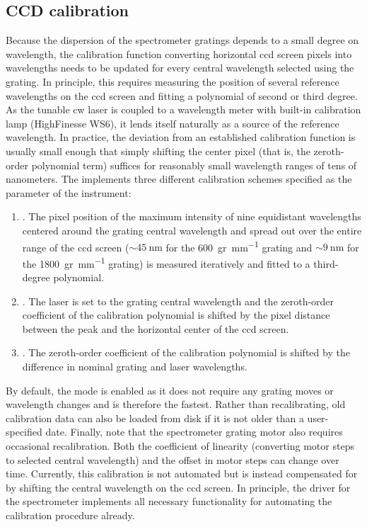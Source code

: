 \subsection{CCD calibration}\label{subsec:sec:exp:mjolnir:calibration:ccd}
Because the dispersion of the spectrometer gratings depends to a small degree on wavelength, the calibration function converting horizontal \gls{ccd} screen pixels into wavelengths needs to be updated for every central wavelength selected using the grating.
In principle, this requires measuring the position of several reference wavelengths on the \gls{ccd} screen and fitting a polynomial of second or third degree.
As the tunable \gls{cw} laser is coupled to a wavelength meter with built-in calibration lamp (HighFinesse WS6), it lends itself naturally as a source of the reference wavelength.
In practice, the deviation from an established calibration function is usually small enough that simply shifting the center pixel (that is, the zeroth-order polynomial term) suffices for reasonably small wavelength ranges of tens of nanometers.
The  implements three different calibration schemes specified as the  parameter of the  instrument:
\begin{enumerate}
    \item {}.
        The pixel position of the maximum intensity of nine equidistant wavelengths centered around the grating central wavelength and spread out over the entire range of the \gls{ccd} screen ($\sim\qty{45}{\nano\meter}$ for the \qty{600}{gr\per\milli\meter} grating and $\sim\qty{9}{\nano\meter}$ for the \qty{1800}{gr\per\milli\meter} grating) is measured iteratively and fitted to a third-degree polynomial.
    \item {}.
        The laser is set to the grating central wavelength and the zeroth-order coefficient of the calibration polynomial is shifted by the pixel distance between the peak and the horizontal center of the \gls{ccd} screen.
    \item {}.
        The zeroth-order coefficient of the calibration polynomial is shifted by the difference in nominal grating and laser wavelengths.
\end{enumerate}
By default, the  mode is enabled as it does not require any grating moves or wavelength changes and is therefore the fastest.
Rather than recalibrating, old calibration data can also be loaded from disk if it is not older than a user-specified date.
Finally, note that the spectrometer grating motor also requires occasional recalibration.
Both the coefficient of linearity (converting motor steps to selected central wavelength) and the offset in motor steps can change over time.
Currently, this calibration is not automated but is instead compensated for by shifting the central wavelength on the \gls{ccd} screen.
In principle, the driver for the \thespectrometer spectrometer implements all necessary functionality for automating the calibration procedure already.


